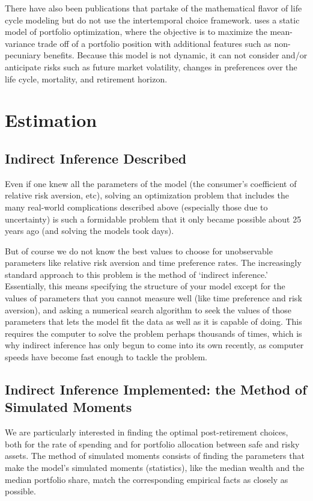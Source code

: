 \documentclass{article}
\begin{document}
There have also been publications that partake of the mathematical flavor of life cycle modeling but do not use the intertemporal choice framework.
\cite{Idzorek_2023} uses a static model of portfolio optimization, where the objective is to maximize the mean-variance trade off of a portfolio position with additional features such as non-pecuniary benefits.
Because this model is not dynamic, it can not consider and/or anticipate risks such as future market volatility, changes in preferences over the life cycle, mortality, and retirement horizon.

\section{Estimation}

\subsection{Indirect Inference Described}

Even if one knew all the parameters of the model (the consumer's coefficient of relative risk aversion, etc), solving an optimization problem that includes the many real-world complications described above (especially those due to uncertainty) is such a formidable problem that it only became possible about 25 years ago (and solving the models took days).

But of course we do not know the best values to choose for unobservable parameters like relative risk aversion and time preference rates.
The increasingly standard approach to this problem is the method of `indirect inference.'
Essentially, this means specifying the structure of your model except for the values of parameters that you cannot measure well (like time preference and risk aversion), and asking a numerical search algorithm to seek the values of those parameters that lets the model fit the data as well as it is capable of doing.
This requires the computer to solve the problem perhaps thousands of times, which is why indirect inference has only begun to come into its own recently, as computer speeds have become fast enough to tackle the problem.

\subsection{Indirect Inference Implemented: the Method of Simulated Moments}

We are particularly interested in finding the optimal post-retirement choices, both for the rate of spending and for portfolio allocation between safe and risky assets.
The method of simulated moments consists of finding the parameters that make the model's simulated moments (statistics), like the median wealth and the median portfolio share, match the corresponding empirical facts as closely as possible.
\end{document}
